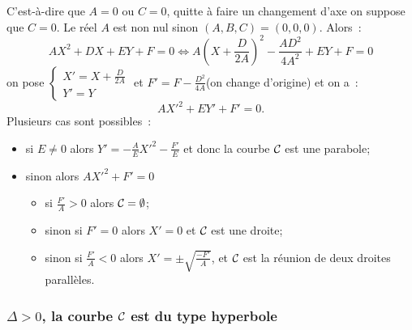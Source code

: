 C'est-à-dire que \(A = 0\) ou \(C = 0\), quitte à faire un changement d'axe on 
suppose que \(C = 0\). Le réel \(A\) est non nul sinon \((A, B, C) = (0, 0, 0)\). 
Alors~:
\begin{equation}
  AX^2 + DX + EY + F = 0 \iff A\left(X + \frac{D}{2A}\right)^2-\frac{AD^2}{4A^2} 
  + EY + F = 0
\end{equation}
on pose \(\begin{cases}X' = X + \frac{D}{2A} \\ Y' = Y\end{cases}\) et 
\(F' = F - \frac{D^2}{4A}\)(on change d'origine) et on a~:
\begin{equation}
  AX'^2 + EY' + F' = 0.
\end{equation}
Plusieurs cas sont possibles~:
\begin{itemize}
  \item si \(E \neq 0\) alors \(Y' = -\frac{A}{E}X'^2 - \frac{F'}{E}\) et donc 
    la courbe \(\mathcal{C}_{{}}\) est une parabole;
  \item sinon alors \(AX'^2 + F' = 0\)
    \begin{itemize}
      \item si \(\frac{F'}{A}>0\) alors \(\mathcal{C}_{{} } =\emptyset\);
      \item sinon si \(F' = 0\) alors \(X' = 0\) et \(\mathcal{C}_{{}}\) est une droite;
      \item sinon si \(\frac{F'}{A}<0\) alors \(X' = \pm \sqrt{\frac{-F'}{A}}\), 
        et \(\mathcal{C}_{{}}\) est la réunion de deux droites parallèles.
    \end{itemize}
\end{itemize}

\subsubsection{\(\Delta>0\), la courbe \(\mathcal{C}_{{}}\) est du type hyperbole}

